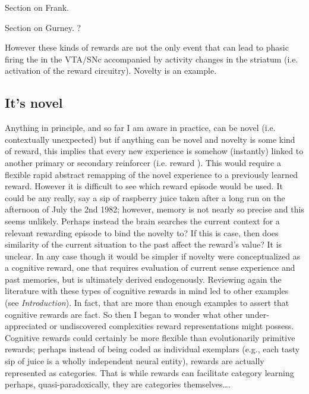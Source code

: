 \documentclass[doc,12pt]{apa}        %
\begin{document}
Section on Frank.  

Section on Gurney.  ?


However these kinds of rewards are not the only event that can lead to phasic firing the in the VTA/SNc accompanied by activity changes in the striatum (i.e. activation of the reward circuitry).  Novelty is an example.

\subsection{It's novel} %
\label{sub:it_s_novel}

Anything in principle, and so far I am aware in practice, can be novel (i.e. contextually unexpected) but if anything can be novel and novelty is some kind of reward, this implies that every new experience is somehow (instantly) linked to another primary or secondary reinforcer (i.e. reward ).  This would require a flexible rapid abstract remapping of the novel experience to a previously learned reward.  However it is difficult to see which reward episode would be used.  It could be any really, say a sip of raspberry juice taken after a long run on the afternoon of July the 2nd 1982; however, memory is not nearly so precise and this seems unlikely.  Perhaps instead the brain searches the current context for a relevant rewarding episode to bind the novelty to?  If this is case, then does similarity of the current situation to the past affect the reward's value?  It is unclear.  In any case though it would be simpler if novelty were conceptualized as a cognitive reward, one that requires evaluation of current sense experience and past memories, but is ultimately derived endogenously.  Reviewing again the literature with these types of cognitive rewards in mind led to other examples (see \emph{Introduction}).  In fact, that are more than enough examples to assert that cognitive rewards are fact.  So then I began to wonder what other under-appreciated or undiscovered complexities reward representations might possess.  Cognitive rewards could certainly be more flexible than evolutionarily primitive rewards; perhaps instead of being coded as individual exemplars (e.g., each tasty sip of juice is a wholly independent neural entity), rewards are actually represented as categories.  That is while rewards can facilitate category learning perhaps, quasi-paradoxically, they are categories themselves\ldots.
\end{document}
